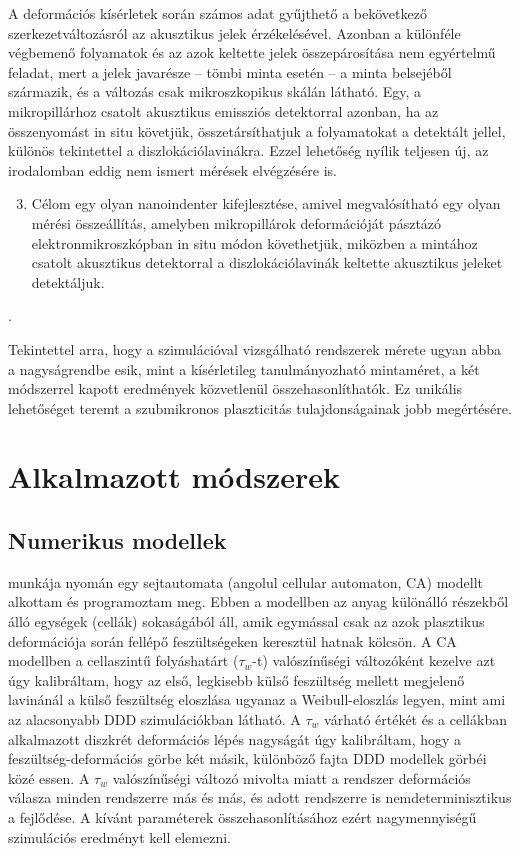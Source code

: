 A deformációs kísérletek során számos adat gyűjthető a bekövetkező szerkezetváltozásról az akusztikus jelek érzékelésével. Azonban a különféle végbemenő folyamatok és az azok keltette jelek összepárosítása nem egyértelmű feladat, mert a jelek javarésze -- tömbi minta esetén -- a minta belsejéből származik, és a változás csak mikroszkopikus skálán látható. Egy, a mikropillárhoz csatolt akusztikus emissziós detektorral azonban, ha az összenyomást in situ követjük, összetársíthatjuk a folyamatokat a detektált jellel, különös tekintettel a diszlokációlavinákra. Ezzel lehetőség nyílik teljesen új, az irodalomban eddig nem ismert mérések elvégzésére is. 

\begin{enumerate}
\setcounter{enumi}{2}
\item Célom egy olyan nanoindenter kifejlesztése, amivel megvalósítható egy olyan mérési összeállítás, amelyben mikropillárok deformációját pásztázó elektronmikroszkópban in situ módon követhetjük, miközben a mintához csatolt akusztikus detektorral a diszlokációlavinák keltette akusztikus jeleket detektáljuk.
\end{enumerate}.

Tekintettel arra, hogy a szimulációval vizsgálható rendszerek mérete ugyan abba a nagyságrendbe esik, mint a kísérletileg tanulmányozható mintaméret, a két módszerrel kapott eredmények közvetlenül összehasonlíthatók. Ez unikális lehetőséget teremt a szubmikronos plaszticitás tulajdonságainak jobb megértésére.

\section*{Alkalmazott módszerek}
\subsection*{Numerikus modellek}

 munkája nyomán egy sejtautomata (angolul cellular automaton, CA) modellt alkottam és programoztam meg. Ebben a modellben az anyag különálló részekből álló egységek (cellák) sokaságából áll, amik egymással csak az azok plasztikus deformációja során fellépő feszültségeken keresztül hatnak kölcsön. A CA modellben a cellaszintű folyáshatárt ($\tau_w$-t) valószínűségi változóként kezelve azt úgy kalibráltam, hogy az első, legkisebb külső feszültség mellett megjelenő lavinánál a külső feszültség eloszlása ugyanaz a Weibull-eloszlás legyen, mint ami az alacsonyabb DDD szimulációkban látható. A $\tau_w$ várható értékét és a cellákban alkalmazott diszkrét deformációs lépés nagyságát úgy kalibráltam, hogy a feszültség-deformációs görbe két másik, különböző fajta DDD modellek görbéi közé essen. A $\tau_w$ valószínűségi változó mivolta miatt a rendszer deformációs válasza minden rendszerre más és más, és adott rendszerre is nemdeterminisztikus a fejlődése. A kívánt paraméterek összehasonlításához ezért nagymennyiségű szimulációs eredményt kell elemezni.

